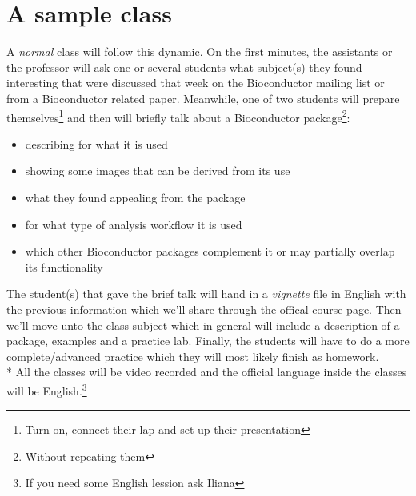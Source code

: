 \documentclass[letterpaper,12pt]{article}
\begin{document}
\section{A sample class}
A \emph{normal} class will follow this dynamic. On the first minutes, the assistants or the professor will ask one or several students what subject(s) they found interesting that were discussed that week on the Bioconductor mailing list or from a Bioconductor related paper. Meanwhile, one of two students will prepare themselves\footnote{Turn on, connect their lap and set up their presentation} and then will briefly talk about a Bioconductor package\footnote{Without repeating them}:
  \begin{itemize}
  \item describing for what it is used
  \item showing some images that can be derived from its use
  \item what they found appealing from the package
  \item for what type of analysis workflow it is used
  \item which other Bioconductor packages complement it or may partially overlap its functionality
  \end{itemize}
The student(s) that gave the brief talk will hand in a \emph{vignette} file in English with the previous information which we'll share through the offical course page. Then we'll move unto the class subject which in general will include a description of a package, examples and a practice lab. Finally, the students will have to do a more complete/advanced practice which they will most likely finish as homework.
\\* \indent All the classes will be video recorded and the official language inside the classes will be English.\footnote{If you need some English lession ask Iliana}
\end{document}
